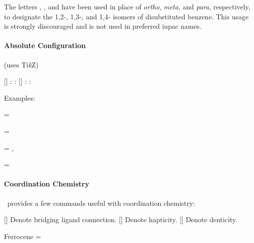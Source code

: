\documentclass[load-preamble+]{cnltx-doc}
\newcommand*\TikZ{Ti\textit{k}Z}
\begin{document}
\begin{cnltxquote}
  The letters \iupac{\ortho}, \iupac{\meta}, and \iupac{\para} have been used
  in place of \textit{ortho}, \textit{meta}, and \textit{para}, respectively,
  to designate the 1,2-, 1,3-, and 1,4- isomers of disubstituted benzene.
  This usage is strongly discouraged and is not used in preferred \acs{iupac}
  names.
\end{cnltxquote}

\paragraph{Absolute Configuration} (uses \TikZ)
\begin{commands}
  []
    : \Rconf \quad {}\oarg{}: \Rconf[]
  []
    : \Sconf \quad {}\oarg{}: \Sconf[]
\end{commands}

Examples:\nopagebreak
\begin{example}
   =
   \par
   =
   \par
   =
  , \par
   \par
   =
\end{example}

\paragraph{Coordination Chemistry}

\chemmacros\ provides a few commands useful with coordination chemistry:
\begin{commands}
  [\quad{}]
    Denote bridging ligand connection.
  [\quad{}]
    Denote hapticity.
  [\quad{}]
    Denote denticity.
\end{commands}
\begin{example}
  Ferrocene =  \par
\end{example}
\end{document}
